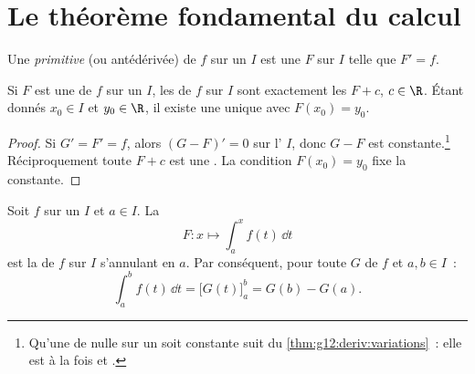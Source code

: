 \section{Le théorème fondamental du calcul}

\begin{definition}[Primitive]\label{def:g12:integ:primitive}
Une \emph{primitive} (ou antédérivée) de $f$ sur un
 $I$ est une   $F$ sur $I$ telle que
$F' = f$.
\end{definition}

\begin{proposition}\label{prop:g12:integ:primunique}
Si $F$ est une  de $f$ sur un  $I$, les  de
$f$ sur $I$ sont exactement les  $F + c$, $c \in \R$. Étant
donnés $x_0 \in I$ et $y_0 \in \R$, il existe une unique  avec
$F(x_0) = y_0$.
\end{proposition}

\begin{proof}
Si $G' = F' = f$, alors $(G - F)' = 0$ sur l' $I$, donc
$G - F$ est constante.\footnote{Qu'une  de  nulle sur un
 soit constante suit du \cref{thm:g12:deriv:variations}~: elle
est à la fois  et .} Réciproquement toute $F + c$
est une . La condition $F(x_0) = y_0$ fixe la constante.
\end{proof}

\begin{theorem}\label{thm:g12:integ:ftc}
Soit $f$  sur un  $I$ et $a \in I$. La 
\[
F \colon x \longmapsto \int_a^x f(t)\,\dd t
\]
est la  de $f$ sur $I$ s'annulant en $a$. Par conséquent, pour
toute  $G$ de $f$ et $a, b \in I$~:
\[
\int_a^b f(t)\,\dd t = \bigl[G(t)\bigr]_a^b = G(b) - G(a).
\]
\end{theorem}

